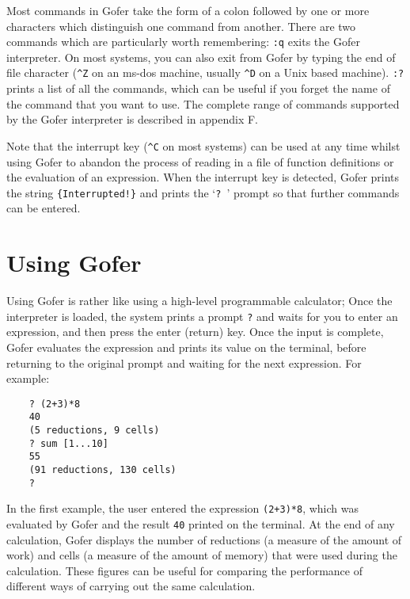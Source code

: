 Most commands in Gofer take the form of a colon followed by one or more
characters which distinguish one command from another.  There  are  two
commands which are particularly worth remembering:
\BI
\IT \verb":q"  exits the  Gofer  interpreter.   On most systems, you can also
     exit from Gofer by typing the end of  file  character  (\verb=^Z=  on  an
     {\sc ms-dos} machine, usually \verb=^D= on a Unix based machine).
\IT \verb":?"  prints a list of all the commands,  which can be useful if you
     forget the name of the command that you want to use.
\EI
The complete range of commands supported by the  Gofer  interpreter  is
described in appendix F.

Note that the interrupt key (\verb=^C= on most systems) can  be  used  at  any
time whilst using Gofer to abandon the process of reading in a file  of
function definitions or the evaluation  of  an  expression.   When  the
interrupt key is detected, Gofer prints the string \verb={Interrupted!}= and
prints the `\verb=? =' prompt so that further commands can be entered.


\chapter{Using Gofer} %

Using Gofer is rather like using a high-level programmable  calculator;
Once the interpreter is loaded, the system  prints  a  prompt  \verb"?"  and
waits for you to enter an expression, and then press the enter (return)
key.  Once the input is complete, Gofer evaluates  the  expression  and
prints its value on the terminal,  before  returning  to  the  original
prompt and waiting for the next expression.  For example:
\begin{verbatim}
    ? (2+3)*8
    40
    (5 reductions, 9 cells)
    ? sum [1...10]
    55
    (91 reductions, 130 cells)
    ? 
\end{verbatim}
In the first example, the user entered the expression \verb"(2+3)*8",  which
was evaluated by Gofer and the result \verb"40" printed on the terminal.  At
the end of any calculation, Gofer displays the number of reductions  (a
measure of the amount of work) and cells (a measure of  the  amount  of
memory) that were used during the calculation.  These  figures  can  be
useful for comparing the performance of different ways of carrying  out
the same calculation.

